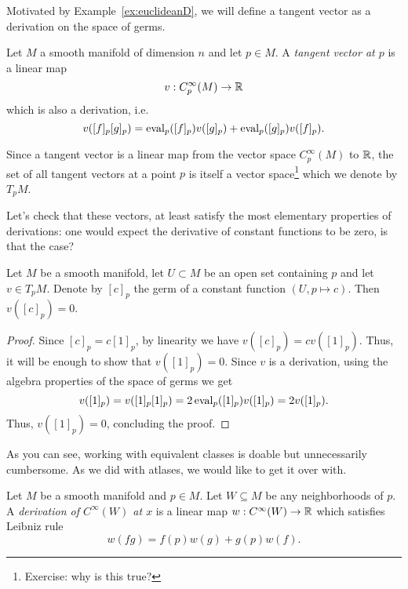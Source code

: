 Motivated by Example~\ref{ex:euclideanD}, we will define a tangent vector as a derivation on the space of germs.

\begin{defn}
    Let $M$ a smooth manifold of dimension $n$ and let $p\in M$.
    A \emph{tangent vector at $p$} is a linear map
    \begin{equation}\label{def:tangentvector}
        v: C_p^\infty(M)\to\mathbb{R}
    \end{equation}
    which is also a derivation, i.e.
    \begin{equation}
        v([f]_p [g]_p) =
            \operatorname{eval}_p([f]_p)v([g]_p)
            + \operatorname{eval}_p([g]_p)v([f]_p).
    \end{equation}

    Since a tangent vector is a linear map from the vector space $C_p^\infty(M)$ to $\mathbb{R}$, the set of all tangent vectors at a point $p$ is itself a vector space\footnote{Exercise: why is this true?} which we denote by $T_p M$.
\end{defn}

Let's check that these vectors, at least satisfy the most elementary properties of derivations: one would expect the derivative of constant functions to be zero, is that the case?

\begin{lem}\label{lem:f'0is0forconst}
    Let $M$ be a smooth manifold, let $U\subset M$ be an open set containing $p$ and let $v\in T_p M$.
    Denote by $[c]_p$ the germ of a constant function $(U, p \mapsto c)$.
    Then $v([c]_p) = 0$.
\end{lem}
\begin{proof}
    Since $[c]_p = c [1]_p$, by linearity we have $v([c]_p) = c v([1]_p)$.
    Thus, it will be enough to show that $v([1]_p) = 0$.
    Since $v$ is a derivation, using the algebra properties of the space of germs we get
    \begin{equation}
        v([1]_p) = v([1]_p [1]_p) = 2 \operatorname{eval}_p([1]_p)v([1]_p) = 2 v([1]_p).
    \end{equation}
    Thus, $v([1]_p) = 0$, concluding the proof.
\end{proof}

As you can see, working with equivalent classes is doable but unnecessarily cumbersome. As we did with atlases, we would like to get it over with.

\begin{defn}
    Let $M$ be a smooth manifold and $p\in M$.
    Let $W\subseteq M$ be any neighborhoods of $p$.
    A \emph{derivation of $C^\infty(W)$ at $x$} is a linear map $w:C^\infty(W)\to\mathbb{R}$ which satisfies Leibniz rule
    \begin{equation}
        w(fg) = f(p)w(g) + g(p)w(f).
    \end{equation}
\end{defn}

